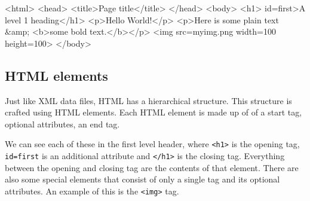 \documentclass[
  letterpaper,
  DIV=11,
  numbers=noendperiod]{scrreprt}
\newenvironment{Shaded}{\begin{snugshade}}{\end{snugshade}}
\newcommand{\DataTypeTok}[1]{\textcolor[rgb]{0.68,0.00,0.00}{#1}}
\newcommand{\DecValTok}[1]{\textcolor[rgb]{0.68,0.00,0.00}{#1}}
\newcommand{\KeywordTok}[1]{\textcolor[rgb]{0.00,0.23,0.31}{#1}}
\newcommand{\NormalTok}[1]{\textcolor[rgb]{0.00,0.23,0.31}{#1}}
\newcommand{\OperatorTok}[1]{\textcolor[rgb]{0.37,0.37,0.37}{#1}}
\newcommand{\OtherTok}[1]{\textcolor[rgb]{0.00,0.23,0.31}{#1}}
\newcommand{\StringTok}[1]{\textcolor[rgb]{0.13,0.47,0.30}{#1}}
\begin{document}
\begin{Shaded}
\begin{Highlighting}[]
\DataTypeTok{\textless{}}\KeywordTok{html}\DataTypeTok{\textgreater{}}
\DataTypeTok{\textless{}}\KeywordTok{head}\DataTypeTok{\textgreater{}}
  \DataTypeTok{\textless{}}\KeywordTok{title}\DataTypeTok{\textgreater{}}\NormalTok{Page title}\DataTypeTok{\textless{}/}\KeywordTok{title}\DataTypeTok{\textgreater{}}
\DataTypeTok{\textless{}/}\KeywordTok{head}\DataTypeTok{\textgreater{}}
\DataTypeTok{\textless{}}\KeywordTok{body}\DataTypeTok{\textgreater{}}
  \DataTypeTok{\textless{}}\KeywordTok{h1}\DataTypeTok{\textgreater{}}\NormalTok{ id=\textquotesingle{}first\textquotesingle{}\textgreater{}A level 1 heading}\DataTypeTok{\textless{}/}\KeywordTok{h1}\DataTypeTok{\textgreater{}}
  \DataTypeTok{\textless{}}\KeywordTok{p}\DataTypeTok{\textgreater{}}\NormalTok{Hello World!}\DataTypeTok{\textless{}/}\KeywordTok{p}\DataTypeTok{\textgreater{}}
  \DataTypeTok{\textless{}}\KeywordTok{p}\DataTypeTok{\textgreater{}}\NormalTok{Here is some plain text }\DecValTok{\&amp;} \DataTypeTok{\textless{}}\KeywordTok{b}\DataTypeTok{\textgreater{}}\NormalTok{some bold text.}\DataTypeTok{\textless{}/}\KeywordTok{b}\DataTypeTok{\textgreater{}\textless{}/}\KeywordTok{p}\DataTypeTok{\textgreater{}}
  \DataTypeTok{\textless{}}\KeywordTok{img}\OtherTok{ src}\OperatorTok{=}\StringTok{\textquotesingle{}myimg.png\textquotesingle{}}\OtherTok{ width}\OperatorTok{=}\StringTok{\textquotesingle{}100\textquotesingle{}}\OtherTok{ height}\OperatorTok{=}\StringTok{\textquotesingle{}100\textquotesingle{}}\DataTypeTok{\textgreater{}}
\DataTypeTok{\textless{}/}\KeywordTok{body}\DataTypeTok{\textgreater{}}
\end{Highlighting}
\end{Shaded}

\subsection{HTML elements}\label{html-elements}

Just like XML data files, HTML has a hierarchical structure. This
structure is crafted using HTML elements. Each HTML element is made up
of of a start tag, optional attributes, an end tag.

We can see each of these in the first level header, where
\texttt{\textless{}h1\textgreater{}} is the opening tag,
\texttt{id=\textquotesingle{}first\textquotesingle{}} is an additional
attribute and \texttt{\textless{}/h1\textgreater{}} is the closing tag.
Everything between the opening and closing tag are the contents of that
element. There are also some special elements that consist of only a
single tag and its optional attributes. An example of this is the
\texttt{\textless{}img\textgreater{}} tag.
\end{document}
